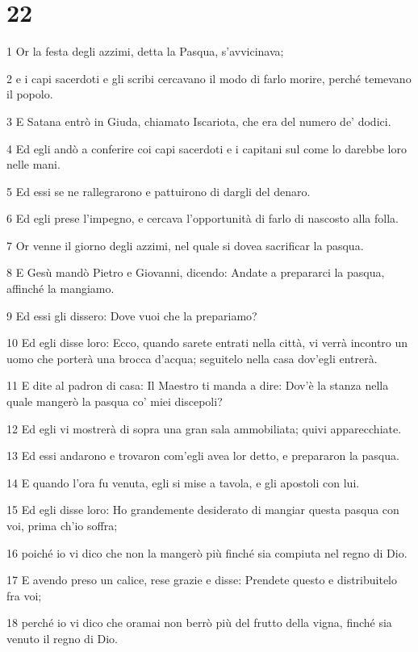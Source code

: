 \chapter{22}

\par 1 Or la festa degli azzimi, detta la Pasqua, s'avvicinava;
\par 2 e i capi sacerdoti e gli scribi cercavano il modo di farlo morire, perché temevano il popolo.
\par 3 E Satana entrò in Giuda, chiamato Iscariota, che era del numero de' dodici.
\par 4 Ed egli andò a conferire coi capi sacerdoti e i capitani sul come lo darebbe loro nelle mani.
\par 5 Ed essi se ne rallegrarono e pattuirono di dargli del denaro.
\par 6 Ed egli prese l'impegno, e cercava l'opportunità di farlo di nascosto alla folla.
\par 7 Or venne il giorno degli azzimi, nel quale si dovea sacrificar la pasqua.
\par 8 E Gesù mandò Pietro e Giovanni, dicendo: Andate a prepararci la pasqua, affinché la mangiamo.
\par 9 Ed essi gli dissero: Dove vuoi che la prepariamo?
\par 10 Ed egli disse loro: Ecco, quando sarete entrati nella città, vi verrà incontro un uomo che porterà una brocca d'acqua; seguitelo nella casa dov'egli entrerà.
\par 11 E dite al padron di casa: Il Maestro ti manda a dire: Dov'è la stanza nella quale mangerò la pasqua co' miei discepoli?
\par 12 Ed egli vi mostrerà di sopra una gran sala ammobiliata; quivi apparecchiate.
\par 13 Ed essi andarono e trovaron com'egli avea lor detto, e prepararon la pasqua.
\par 14 E quando l'ora fu venuta, egli si mise a tavola, e gli apostoli con lui.
\par 15 Ed egli disse loro: Ho grandemente desiderato di mangiar questa pasqua con voi, prima ch'io soffra;
\par 16 poiché io vi dico che non la mangerò più finché sia compiuta nel regno di Dio.
\par 17 E avendo preso un calice, rese grazie e disse: Prendete questo e distribuitelo fra voi;
\par 18 perché io vi dico che oramai non berrò più del frutto della vigna, finché sia venuto il regno di Dio.
